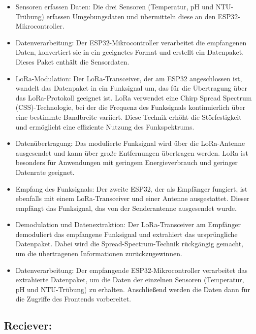 \begin{itemize}
  \item Sensoren erfassen Daten: Die drei Sensoren (Temperatur, pH und NTU-Trübung) erfassen Umgebungsdaten und übermitteln diese an den ESP32-Mikrocontroller.
  \item Datenverarbeitung: Der ESP32-Mikrocontroller verarbeitet die empfangenen Daten, konvertiert sie in ein geeignetes Format und erstellt ein Datenpaket. Dieses Paket enthält die Sensordaten.
  \item LoRa-Modulation: Der LoRa-Transceiver, der am ESP32 angeschlossen ist, wandelt das Datenpaket in ein Funksignal um, das für die Übertragung über das LoRa-Protokoll geeignet ist. LoRa verwendet eine Chirp Spread Spectrum (CSS)-Technologie, bei der die Frequenz des Funksignals kontinuierlich über eine bestimmte Bandbreite variiert. Diese Technik erhöht die Störfestigkeit und ermöglicht eine effiziente Nutzung des Funkspektrums.
  \item Datenübertragung: Das modulierte Funksignal wird über die LoRa-Antenne ausgesendet und kann über große Entfernungen übertragen werden. LoRa ist besonders für Anwendungen mit geringem Energieverbrauch und geringer Datenrate geeignet.
  \item Empfang des Funksignals: Der zweite ESP32, der als Empfänger fungiert, ist ebenfalls mit einem LoRa-Transceiver und einer Antenne ausgestattet. Dieser empfängt das Funksignal, das von der Senderantenne ausgesendet wurde.
  \item Demodulation und Datenextraktion: Der LoRa-Transceiver am Empfänger demoduliert das empfangene Funksignal und extrahiert das ursprüngliche Datenpaket. Dabei wird die Spread-Spectrum-Technik rückgängig gemacht, um die übertragenen Informationen zurückzugewinnen.
  \newpage
  \item Datenverarbeitung: Der empfangende ESP32-Mikrocontroller verarbeitet das extrahierte Datenpaket, um die Daten der einzelnen Sensoren (Temperatur, pH und NTU-Trübung) zu erhalten. Anschließend werden die Daten dann für die Zugriffe des Frontends vorbereitet.
\end{itemize}

\subsection*{Reciever:}


